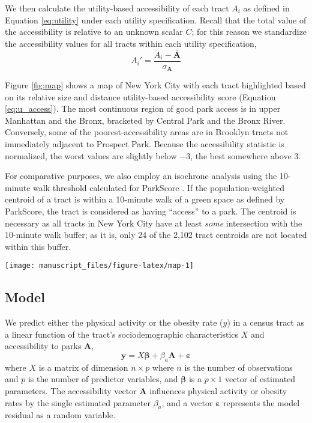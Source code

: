 \documentclass[shortAfour,sageh.bst]{sagej}
\begin{document}
We then calculate the utility-based accessibility of each tract \(A_i\)
as defined in Equation \ref{eq:utility} under each utility
specification. Recall that the total value of the accessibility is
relative to an unknown scalar \(C\); for this reason we standardize the
accessibility values for all tracts within each utility specification,
\begin{equation}\label{eq:v_logged}
A_i' = \frac{A_i - \bar{\boldsymbol{A}}}
            {\sigma_{\boldsymbol{A}}}
\end{equation}

Figure \ref{fig:map} shows a map of New York City with each tract
highlighted based on its relative size and distance utility-based
accessibility score (Equation \ref{eq:u_access}). The most continuous
region of good park access is in upper Manhattan and the Bronx,
bracketed by Central Park and the Bronx River. Conversely, some of the
poorest-accessibility areas are in Brooklyn tracts not immediately
adjacent to Prospect Park. Because the accessibility statistic is
normalized, the worst values are slightly below \(-3\), the best
somewhere above \(3\).

For comparative purposes, we also employ an isochrone analysis using the
10-minute walk threshold calculated for ParkScore \citep{parkscore2019}.
If the population-weighted centroid of a tract is within a 10-minute
walk of a green space as defined by ParkScore, the tract is considered
as having ``access'' to a park. The centroid is necessary as all tracts
in New York City have at least \emph{some} intersection with the
10-minute walk buffer; as it is, only 24 of the 2,102 tract centroids
are not located within this buffer.

\begin{figure*}
\texttt{[image: manuscript\_files/figure-latex/map-1]} \caption{Normalized utility-based park accessibility values in New York City.}\label{fig:map}
\end{figure*}

\hypertarget{model}{%
\subsection{Model}\label{model}}

\label{subsec:model}

We predict either the physical activity or the obesity rate (\(y\)) in a
census tract as a linear function of the tract's sociodemographic
characteristics \(X\) and accessibility to parks \(\boldsymbol{A}\),
\begin{equation}\label{eq:themodel}
 \boldsymbol{y} = X\boldsymbol{\beta} + \beta_{a}\boldsymbol{A} + \boldsymbol{\varepsilon}
\end{equation} where \(X\) is a matrix of dimension \(n\times p\) where
\(n\) is the number of observations and \(p\) is the number of predictor
variables, and \(\boldsymbol{\beta}\) is a \(p\times 1\) vector of
estimated parameters. The accessibility vector \(\boldsymbol{A}\)
influences physical activity or obesity rates by the single estimated
parameter \(\beta_a\), and a vector \(\boldsymbol{\varepsilon}\)
represents the model residual as a random variable.
\end{document}
